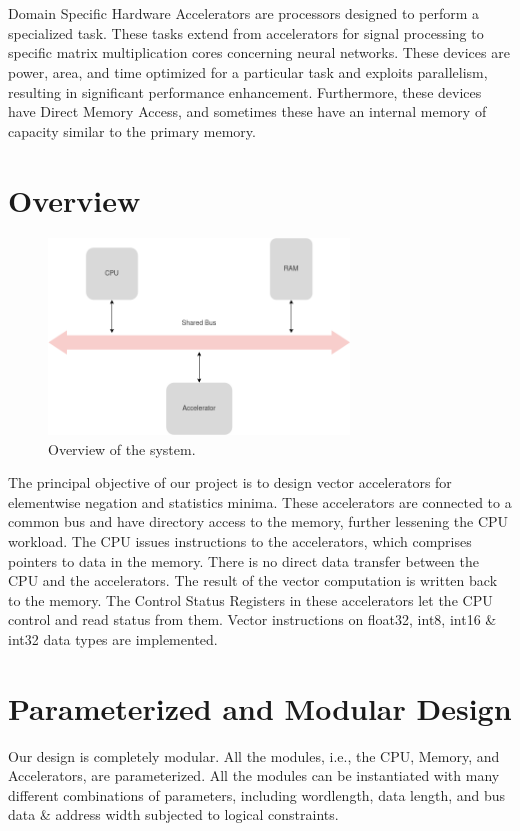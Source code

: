 \begin{paper}
\renewcommand*{\pagemark}{}

\section*{}
Domain Specific Hardware Accelerators are processors designed to perform a specialized task. These tasks extend from accelerators for signal processing to specific matrix multiplication cores concerning neural networks. These devices are power, area, and time optimized for a particular task and exploits parallelism, resulting in significant performance enhancement. Furthermore, these devices have Direct Memory Access, and sometimes these have an internal memory of capacity similar to the primary memory.
\section*{Overview\sdot}

\begin{figure}[H]
\centering
\includegraphics[width=8cm]{Images/Overview-Overview.png}
\caption{\content Overview of the system.}
\end{figure}
\nointend The principal objective of our project is to design vector accelerators for elementwise negation and statistics minima. These accelerators are connected to a common bus and have directory access to the memory, further lessening the CPU workload. The CPU issues instructions to the accelerators, which comprises pointers to data in the memory. There is no direct data transfer between the CPU and the accelerators. The result of the vector computation is written back to the memory. The Control Status Registers in these accelerators let the CPU control and read status from them. Vector instructions on float32, int8, int16 & int32 data types are implemented. 
\section*{Parameterized and Modular Design\sdot}
Our design is completely modular. All the modules, i.e., the CPU, Memory, and Accelerators, are parameterized. All the modules can be instantiated with many different combinations of parameters, including wordlength, data length, and bus data \& address width subjected to logical constraints.


\end{paper}
